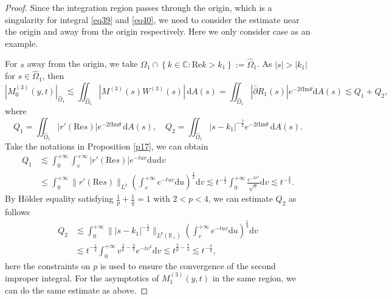\documentclass[11pt]{article}
\numberwithin{equation}{section}
\begin{document}
\begin{proof}
    Since the integration region passes through the origin, which is a singularity for integral \eqref{eq39} and \eqref{eq40}, we need to consider the estimate near the origin and away from the origin respectively. Here we only consider case \uppercase\expandafter{} as an example.


For  $s$ away from the origin, we take $\Omega_1\cap\left\{k\in\mathbb{C}:\mathrm{Re}k>k_1\right\}:=\widehat\Omega_1$. As $|s|>|k_1|$ for $s\in\widehat\Omega_1$, then
\begin{equation*}
|M^{(3)}_0(y,t)|_{\widehat\Omega_1}\lesssim\iint_{\widehat\Omega_1}\left|M^{(3)}(s) W^{(3)}(s) \right|\, \mathrm{d}A(s)=\iint_{\widehat\Omega_1} |\bar{\partial} R_{1}(s)| e^{-2t \mathrm{Im} \theta} \mathrm{d}A(s)\lesssim Q_1+Q_2,
\end{equation*}
where
\begin{equation}
     Q_1 = \iint_{\widehat\Omega_1} |r'(\mathrm{Re}s)| e^{-2t \mathrm{Im} \theta} \, \mathrm{d}A(s),\quad
    Q_2 = \iint_{\widehat\Omega_1} |s - k_1|^{-\frac{1}{2}} e^{-2t \mathrm{Im} \theta} \, \mathrm{d}A(s).
\end{equation}
Take the notations in Proposition \ref{p17}, we can obtain
\begin{align*}
    Q_1&\lesssim\int_0^{+\infty}\int_v^{+\infty}|r'(\mathrm{Re}s)|e^{-tuv}\mathrm{d}u\mathrm{d}v\\
    &\leqslant \int_0^{+\infty}\|r'(\mathrm{Re}s)\|_{L^2}\left(\int_v^{+\infty} e^{-tuv}\mathrm{d}u\right)^{\frac{1}{2}}\mathrm{d}v\lesssim t^{-\frac{1}{2}}\int_0^{+\infty}\frac{e^{-tv^2}}{\sqrt{v}}\mathrm{d}v\lesssim t^{-\frac{3}{4}}.
\end{align*}
By H\"older equality satisfying $\frac{1}{p}+\frac{1}{q}=1$ with $2<p<4$, we can estimate $Q_2$ as follows
\begin{align*}
    Q_2&\lesssim\int_0^{+\infty}\||s-k_1|^{-\frac{1}{2}}\|_{L^p(\mathbb{R}_+)}\left(\int_v^{+\infty}e^{-tuv}\mathrm{d}u\right)^{\frac{1}{q}}\mathrm{d}v\\
    &\lesssim t^{-\frac{1}{q}}\int_0^{+\infty}v^{\frac{2}{p}-\frac{3}{2}}e^{-tv^2}\mathrm{d}v\lesssim t^{\frac{2}{p}-\frac{7}{4}}\lesssim t^{-\frac{3}{4}},
\end{align*}
 here the constraints on $p$ is used to ensure the convergence of the second improper integral. For the asymptotics of $M^{(3)}_1(y, t)$ in the same region, we can do the same estimate as above.


\end{proof}
\end{document}
